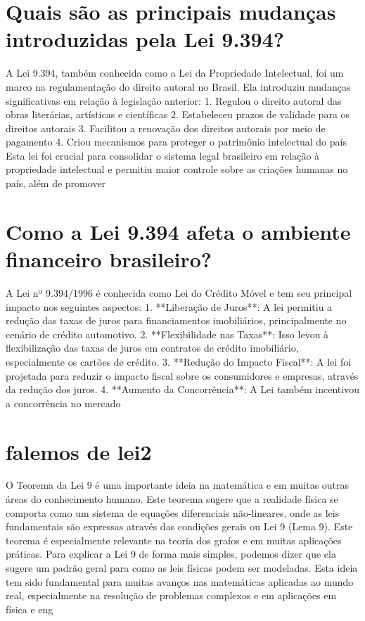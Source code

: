 \documentclass[11pt,a4paper]{article}
\begin{document}
\section{Quais são as principais mudanças introduzidas pela Lei 9.394?}
A Lei 9.394, também conhecida como a Lei da Propriedade Intelectual, foi um marco na regulamentação do direito autoral no Brasil. Ela introduziu mudanças significativas em relação à legislação anterior: 1. Regulou o direito autoral das obras literárias, artísticas e científicas 2. Estabeleceu prazos de validade para os direitos autorais 3. Facilitou a renovação dos direitos autorais por meio de pagamento 4. Criou mecanismos para proteger o patrimônio intelectual do país Esta lei foi crucial para consolidar o sistema legal brasileiro em relação à propriedade intelectual e permitiu maior controle sobre as criações humanas no país, além de promover

\section{Como a Lei 9.394 afeta o ambiente financeiro brasileiro?}
A Lei nº 9.394/1996 é conhecida como Lei do Crédito Móvel e tem seu principal impacto nos seguintes aspectos: 1. **Liberação de Juros**: A lei permitiu a redução das taxas de juros para financiamentos imobiliários, principalmente no cenário de crédito automotivo. 2. **Flexibilidade nas Taxas**: Isso levou à flexibilização das taxas de juros em contratos de crédito imobiliário, especialmente os cartões de crédito. 3. **Redução do Impacto Fiscal**: A lei foi projetada para reduzir o impacto fiscal sobre os consumidores e empresas, através da redução dos juros. 4. **Aumento da Concorrência**: A Lei também incentivou a concorrência no mercado

\section{falemos de lei2}
O Teorema da Lei 9 é uma importante ideia na matemática e em muitas outras áreas do conhecimento humano. Este teorema sugere que a realidade física se comporta como um sistema de equações diferenciais não-lineares, onde as leis fundamentais são expressas através das condições gerais ou Lei 9 (Lema 9). Este teorema é especialmente relevante na teoria dos grafos e em muitas aplicações práticas. Para explicar a Lei 9 de forma mais simples, podemos dizer que ela sugere um padrão geral para como as leis físicas podem ser modeladas. Esta ideia tem sido fundamental para muitas avanços nas matemáticas aplicadas ao mundo real, especialmente na resolução de problemas complexos e em aplicações em física e eng
\end{document}
